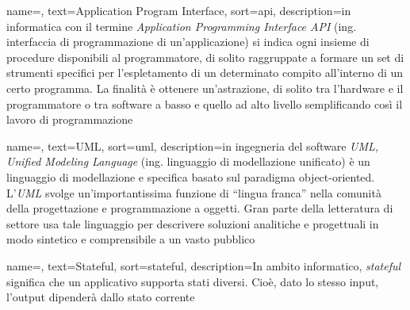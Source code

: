 
\renewcommand{\acronymname}{Acronimi e abbreviazioni}


    
    
    


{
    name=,
    text=Application Program Interface,
    sort=api,
    description={in informatica con il termine \emph{Application Programming Interface API} (ing. interfaccia di programmazione di un'applicazione) si indica ogni insieme di procedure disponibili al programmatore, di solito raggruppate a formare un set di strumenti specifici per l'espletamento di un determinato compito all'interno di un certo programma. La finalità è ottenere un'astrazione, di solito tra l'hardware e il programmatore o tra software a basso e quello ad alto livello semplificando così il lavoro di programmazione}
}

{
    name=,
    text=UML,
    sort=uml,
    description={in ingegneria del software \emph{UML, Unified Modeling Language} (ing. linguaggio di modellazione unificato) è un linguaggio di modellazione e specifica basato sul paradigma object-oriented. L'\emph{UML} svolge un'importantissima funzione di ``lingua franca'' nella comunità della progettazione e programmazione a oggetti. Gran parte della letteratura di settore usa tale linguaggio per descrivere soluzioni analitiche e progettuali in modo sintetico e comprensibile a un vasto pubblico}
}

{
    name=,
    text=Stateful,
    sort=stateful,
    description={In ambito informatico, \emph{stateful} significa che un applicativo supporta stati diversi. Cioè, dato lo stesso input, l'output dipenderà dallo stato corrente}
}

